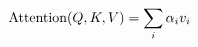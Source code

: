 \documentclass[preview]{standalone}
\begin{document}
\begin{align*}
\special{dvisvgm:raw <g id='unique000'>}\text{Attention}(Q,K,V) = \sum_i \alpha_i v_i\special{dvisvgm:raw </g>}
\end{align*}
\end{document}
